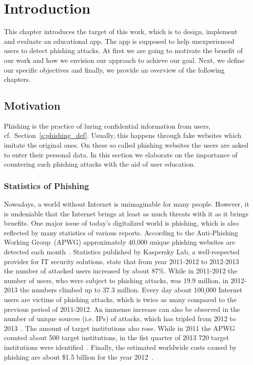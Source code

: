 \section{Introduction}
\label{s:introduction}
This chapter introduces the target of this work, which is to design, implement and evaluate an educational app. The app is supposed to help unexperienced users to detect phishing attacks. At first we are going to motivate the benefit of our work and how we envision our approach to achieve our goal. Next, we define our specific objectives and finally, we provide an overview of the following chapters.

\subsection{Motivation}
Phishing is the practice of luring confidential information from users, cf.~Section~\ref{s:phishing_def}. Usually, this happens through fake websites which imitate the original ones. On these so called phishing websites the users are asked to enter their personal data. In this section we elaborate on the importance of countering such phishing attacks with the aid of user education. 

\subsubsection{Statistics of Phishing}
Nowadays, a world without Internet is unimaginable for many people. However, it is undeniable that the Internet brings at least as much threats with it as it brings benefits. One major issue of today's digitalized world is phishing, which is also reflected by many statistics of various reports. According to the Anti-Phishing Working Group~(APWG) approximately 40,000 unique phishing websites are detected each month~\cite{antiphishingtrendreport2013}. Statistics published by Kaspersky Lab, a well-respected provider for IT security solutions, state that from year 2011-2012 to 2012-2013 the number of attacked users increased by about 87\%. While in 2011-2012 the number of users, who were subject to phishing attacks, was 19.9 million, in 2012-2013 the numbers climbed up to 37.3 million. Every day about 100,000 Internet users are victims of phishing attacks, which is twice as many compared to the previous period of 2011-2012. An immense increase can also be observed in the number of unique sources (i.e. IPs) of attacks, which has tripled from 2012 to 2013~\cite{kasperskyreport2013}. The amount of target institutions also rose. While in 2011 the APWG counted about 500 target institutions, in the fist quarter of 2013 720 target institutions were identified~\cite{antiphishingglobalreport2013}. Finally, the estimated worldwide costs caused by phishing are about \$1.5 billion for the year 2012~\cite{rsa2013}.


